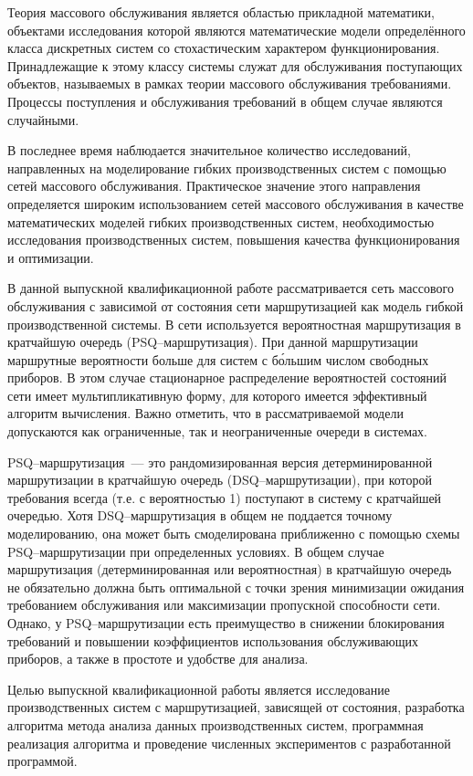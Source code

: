 \intro
Теория массового обслуживания является областью прикладной математики, объектами исследования которой являются математические модели определённого класса дискретных систем со стохастическим характером функционирования. Принадлежащие к этому классу системы служат для обслуживания поступающих объектов, называемых в рамках теории массового обслуживания требованиями. Процессы поступления и обслуживания требований в общем случае являются случайными.

В последнее время наблюдается значительное количество исследований, направленных на моделирование гибких производственных систем с помощью сетей массового обслуживания. Практическое значение этого направления определяется широким использованием сетей массового обслуживания в качестве математических моделей гибких производственных систем, необходимостью исследования производственных систем, повышения качества функционирования и оптимизации.

В данной выпускной квалификационной работе рассматривается сеть массового обслуживания с зависимой от состояния сети маршрутизацией как модель гибкой производственной системы. В сети используется вероятностная маршрутизация в кратчайшую очередь (PSQ--маршрутизация). При данной маршрутизации маршрутные вероятности больше для систем с б\'{о}льшим числом свободных приборов. В этом случае стационарное распределение вероятностей состояний сети имеет мультипликативную форму, для которого имеется эффективный алгоритм вычисления. Важно отметить, что в рассматриваемой модели допускаются как ограниченные, так и неограниченные очереди в системах.

PSQ--маршрутизация~--- это рандомизированная версия детерминированной маршрутизации в кратчайшую очередь (DSQ--маршрутизации), при которой требования всегда (т.е. с вероятностью 1) поступают в систему с кратчайшей очередью. Хотя DSQ--маршрутизация в общем не поддается точному моделированию, она может быть смоделирована приближенно с помощью схемы PSQ--маршрутизации при определенных условиях. В общем случае маршрутизация (детерминированная или вероятностная) в кратчайшую очередь не обязательно должна быть оптимальной с точки зрения минимизации ожидания требованием обслуживания или максимизации пропускной способности сети. Однако, у PSQ--маршрутизации есть преимущество в снижении блокирования требований и повышении коэффициентов использования обслуживающих приборов, а также в простоте и удобстве для анализа.

Целью выпускной квалификационной работы является исследование производственных систем с маршрутизацией, зависящей от состояния, разработка алгоритма метода анализа данных производственных систем, программная реализация алгоритма и проведение численных экспериментов с разработанной программой.

